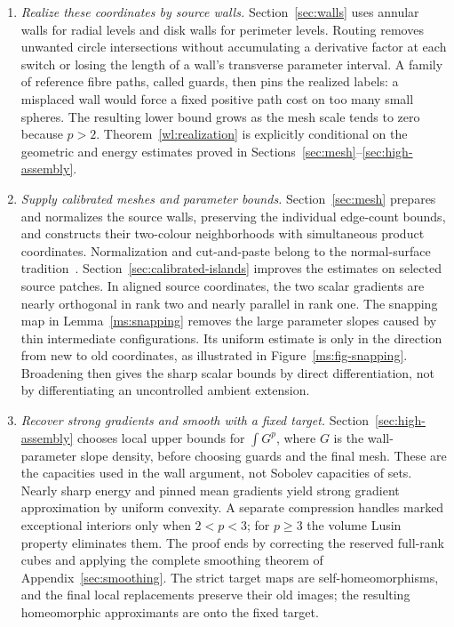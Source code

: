 \documentclass[11pt]{article}
\numberwithin{equation}{section}
\theoremstyle{definition}
\theoremstyle{remark}
\begin{document}
\begin{enumerate}
\item \emph{Realize these coordinates by source walls.}
Section~\ref{sec:walls} uses annular walls for radial levels and
disk walls for perimeter levels.  Routing removes unwanted
circle intersections without accumulating a derivative factor at
each switch or losing the length of a wall's transverse parameter
interval.  A family of reference fibre paths, called guards,
then pins the realized labels: a misplaced wall would force a
fixed positive path cost on too many small spheres.  The resulting
lower bound grows as the mesh scale tends to zero because $p>2$.
Theorem~\ref{wl:realization} is explicitly conditional on the
geometric and energy estimates proved in
Sections~\ref{sec:mesh}--\ref{sec:high-assembly}.

\item \emph{Supply calibrated meshes and parameter bounds.}
Section~\ref{sec:mesh} prepares and normalizes the source walls,
preserving the individual edge-count bounds, and constructs their
two-colour neighborhoods with simultaneous product coordinates.
Normalization and cut-and-paste belong to the normal-surface
tradition~\cite{Haken1961}.  Section~\ref{sec:calibrated-islands}
improves the estimates on selected source patches.  In aligned source
coordinates, the two scalar gradients are nearly orthogonal in rank two and
nearly parallel in rank one.  The snapping map in
Lemma~\ref{ms:snapping} removes the large parameter slopes caused
by thin intermediate configurations.  Its uniform estimate is only
in the direction from new to old coordinates, as illustrated in
Figure~\ref{ms:fig-snapping}.  Broadening then gives the sharp
scalar bounds by direct differentiation, not by differentiating an
uncontrolled ambient extension.

\item \emph{Recover strong gradients and smooth with a fixed target.}
Section~\ref{sec:high-assembly} chooses local upper bounds for
$\int G^p$, where $G$ is the wall-parameter slope density, before
choosing guards and the final mesh.  These are the capacities used
in the wall argument, not Sobolev capacities of sets.  Nearly sharp
energy and pinned mean gradients yield strong gradient approximation
by uniform convexity.  A separate compression handles marked
exceptional interiors only when $2<p<3$; for $p\ge3$ the volume
Lusin property eliminates them.  The proof ends by correcting the
reserved full-rank cubes and applying the complete smoothing theorem
of Appendix~\ref{sec:smoothing}.  The strict target maps are
self-homeomorphisms, and the final local replacements preserve their
old images; the resulting homeomorphic approximants are onto the
fixed target.
\end{enumerate}
\end{document}
